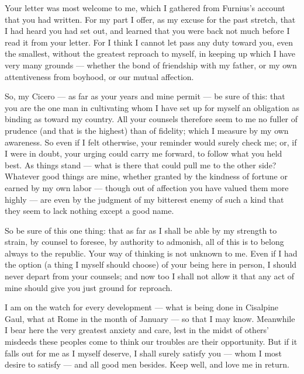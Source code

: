 

 Your letter was most welcome to me, which I gathered from Furnius's account that you had written. For my part I offer, as my excuse for the past stretch, that I had heard you had set out, and learned that you were back not much before I read it from your letter. For I think I cannot let pass any duty toward you, even the smallest, without the greatest reproach to myself, in keeping up which I have very many grounds --- whether the bond of friendship with my father, or my own attentiveness from boyhood, or our mutual affection.

 So, my Cicero --- as far as your years and mine permit --- be sure of this: that you are the one man in cultivating whom I have set up for myself an obligation as binding as toward my country. All your counsels therefore seem to me no fuller of prudence (and that is the highest) than of fidelity; which I measure by my own awareness. So even if I felt otherwise, your reminder would surely check me; or, if I were in doubt, your urging could carry me forward, to follow what you held best. As things stand --- what is there that could pull me to the other side? Whatever good things are mine, whether granted by the kindness of fortune or earned by my own labor --- though out of affection you have valued them more highly --- are even by the judgment of my bitterest enemy of such a kind that they seem to lack nothing except a good name.

 So be sure of this one thing: that as far as I shall be able by my strength to strain, by counsel to foresee, by authority to admonish, all of this is to belong always to the republic. Your way of thinking is not unknown to me. Even if I had the option (a thing I myself should choose) of your being here in person, I should never depart from your counsels; and now too I shall not allow it that any act of mine should give you just ground for reproach.

 I am on the watch for every development --- what is being done in Cisalpine Gaul, what at Rome in the month of January --- so that I may know. Meanwhile I bear here the very greatest anxiety and care, lest in the midst of others' misdeeds these peoples come to think our troubles are their opportunity. But if it falls out for me as I myself deserve, I shall surely satisfy you --- whom I most desire to satisfy --- and all good men besides. Keep well, and love me in return.
